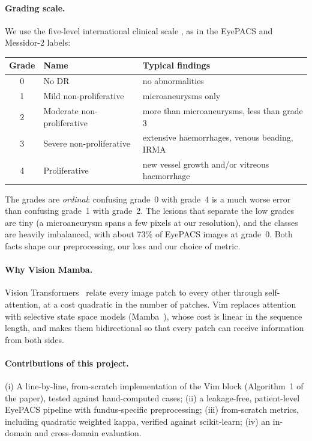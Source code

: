 \documentclass[11pt,a4paper]{article}
\begin{document}
\paragraph{Grading scale.} We use the five-level international clinical scale
\cite{wilkinson2003scale}, as in the EyePACS and Messidor-2 labels:
\begin{center}
\begin{tabular}{cll}
\toprule
Grade & Name & Typical findings \\
\midrule
0 & No DR & no abnormalities \\
1 & Mild non-proliferative & microaneurysms only \\
2 & Moderate non-proliferative & more than microaneurysms, less than grade 3 \\
3 & Severe non-proliferative & extensive haemorrhages, venous beading, IRMA \\
4 & Proliferative & new vessel growth and/or vitreous haemorrhage \\
\bottomrule
\end{tabular}
\end{center}
The grades are \emph{ordinal}: confusing grade~0 with grade~4 is a much worse error
than confusing grade~1 with grade~2. The lesions that separate the low grades are
tiny (a microaneurysm spans a few pixels at our resolution), and the classes are
heavily imbalanced, with about 73\% of EyePACS images at grade~0. Both facts shape
our preprocessing, our loss and our choice of metric.

\paragraph{Why Vision Mamba.} Vision Transformers~\cite{dosovitskiy2021vit} relate
every image patch to every other through self-attention, at a cost quadratic in the
number of patches. Vim replaces attention with selective state space models
(Mamba~\cite{gu2023mamba}), whose cost is linear in the sequence length, and makes
them bidirectional so that every patch can receive information from both sides.

\paragraph{Contributions of this project.}
(i) A line-by-line, from-scratch implementation of the Vim block (Algorithm~1 of the
paper), tested against hand-computed cases; (ii) a leakage-free, patient-level
EyePACS pipeline with fundus-specific preprocessing; (iii) from-scratch metrics,
including quadratic weighted kappa, verified against scikit-learn; (iv) an in-domain
and cross-domain evaluation.
\end{document}
